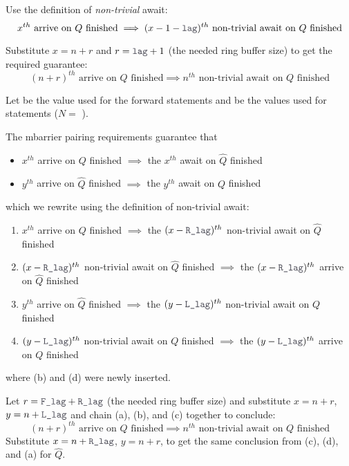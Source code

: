 \filbreak
Use the definition of \textit{non-trivial} await:
\begin{equation*}
  x^{th} \text{ arrive on $Q$ finished} \implies (x-1-\lighttt{lag})^{th} \text{ non-trivial await on $Q$ finished}
\end{equation*}

\filbreak
Substitute $x=n+r$ and $r=\lighttt{lag}+1$ (the needed ring buffer size) to get the required guarantee:
\begin{equation*}
  (n+r)^{th} \text{ arrive on $Q$ finished} \implies n^{th} \text{ non-trivial await on $Q$ finished}
\end{equation*}

\filbreak
{}
Let  be the  value used for the forward  statements and  be the  values used for  statements ($N =$ ).

\filbreak
The mbarrier pairing requirements guarantee that
\begin{itemize}
  \item $x^{th}$ arrive on $Q$ finished $\implies$ the $x^{th}$ await on $\widehat{Q}$ finished
  \filbreak
  \item $y^{th}$ arrive on $\widehat{Q}$ finished $\implies$ the $y^{th}$ await on $Q$ finished
\end{itemize}
\filbreak
which we rewrite using the definition of non-trivial await:
\begin{enumerate}
  \item $x^{th}$ arrive on $Q$ finished $\implies$ the $(x-\lighttt{R\_lag})^{th}$ non-trivial await on $\widehat{Q}$ finished
  \filbreak
  \item $(x-\lighttt{R\_lag})^{th}$ non-trivial await on $\widehat{Q}$ finished $\implies$ the $(x-\lighttt{R\_lag})^{th}$ arrive on $\widehat{Q}$ finished
  \filbreak
  \item $y^{th}$ arrive on $\widehat{Q}$ finished $\implies$ the $(y-\lighttt{L\_lag})^{th}$ non-trivial await on $Q$ finished
  \filbreak
  \item $(y-\lighttt{L\_lag})^{th}$ non-trivial await on $Q$ finished $\implies$ the $(y-\lighttt{L\_lag})^{th}$ arrive on $Q$ finished
\end{enumerate}
where (b) and (d) were newly inserted.

\filbreak
Let $r = \lighttt{F\_lag} + \lighttt{R\_lag}$ (the needed ring buffer size) and substitute $x = n + r$, $y = n + \lighttt{L\_lag}$ and chain (a), (b), and (c) together to conclude:
\begin{equation*}
  (n+r)^{th} \text{ arrive on $Q$ finished} \implies n^{th} \text{ non-trivial await on $Q$ finished}
\end{equation*}
Substitute $x = n + \lighttt{R\_lag}$, $y = n+r$, to get the same conclusion from (c), (d), and (a) for $\widehat{Q}$.


